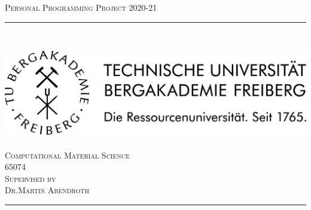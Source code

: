 \begin{titlepage}

    \begin{center}
    \textsc{Personal Programming Project 2020-21 }\\
    \vspace*{0.5 cm}
    {\LARGE \textsc{\mytitle}} %
    \vspace{0.025\textheight}
    \rule{0.75\textwidth}{0.45pt}\\
    \vspace*{1 cm}
    
    \includegraphics[scale=0.6]{WBM_schwarz.png}\\
    \vspace*{2.5 cm}
    {\large \textsc{\myauthor}}\\ %
    \vspace{0.025\textheight}
    {\textsc{Computational Material Science}}\\
	\vspace{0.025\textheight}
	{65074}\\
	\vfill
	\textsc{Supervised by}\\
	\vspace{0.0025\textheight}
	{\textsc{Dr.Martin Abendroth}}\\
	\vspace{2 cm}
	{\mydate}
    \vspace{0.25\textheight}     	
	\rule{\textwidth}{1.5pt} 
    \end{center} 
         
\end{titlepage}
